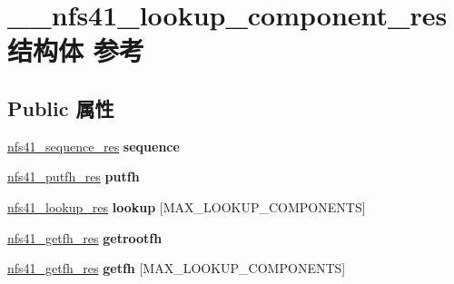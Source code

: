 \hypertarget{struct____nfs41__lookup__component__res}{}\section{\+\_\+\+\_\+nfs41\+\_\+lookup\+\_\+component\+\_\+res结构体 参考}
\label{struct____nfs41__lookup__component__res}
\subsection*{Public 属性}
\begin{DoxyCompactItemize}
\item 
\mbox{\label{struct____nfs41__lookup__component__res_a05266724df5172a0e633320802f199c8}} 
\hyperlink{struct____nfs41__sequence__res}{nfs41\+\_\+sequence\+\_\+res} {\bfseries sequence}
\item 
\mbox{\label{struct____nfs41__lookup__component__res_a7acc32a4524605dff298838cafaaf6e9}} 
\hyperlink{struct____nfs41__putfh__res}{nfs41\+\_\+putfh\+\_\+res} {\bfseries putfh}
\item 
\mbox{\label{struct____nfs41__lookup__component__res_ab3e73c4527ddb2ef5a87f1fa4c0109e8}} 
\hyperlink{struct____nfs41__lookup__res}{nfs41\+\_\+lookup\+\_\+res} {\bfseries lookup} \mbox{[}M\+A\+X\+\_\+\+L\+O\+O\+K\+U\+P\+\_\+\+C\+O\+M\+P\+O\+N\+E\+N\+TS\mbox{]}
\item 
\mbox{\label{struct____nfs41__lookup__component__res_a7882b2aa61f8846d317afcff160af387}} 
\hyperlink{struct____nfs41__getfh__res}{nfs41\+\_\+getfh\+\_\+res} {\bfseries getrootfh}
\item 
\mbox{\label{struct____nfs41__lookup__component__res_ac4b929c039c6c9fcc28a7109ac8f7dd8}} 
\hyperlink{struct____nfs41__getfh__res}{nfs41\+\_\+getfh\+\_\+res} {\bfseries getfh} \mbox{[}M\+A\+X\+\_\+\+L\+O\+O\+K\+U\+P\+\_\+\+C\+O\+M\+P\+O\+N\+E\+N\+TS\mbox{]}
\item 
\mbox{\label{struct____nfs41__lookup__component__res_a612e4099840df92eb1723287ead72c83}} 

\end{DoxyCompactItemize}
